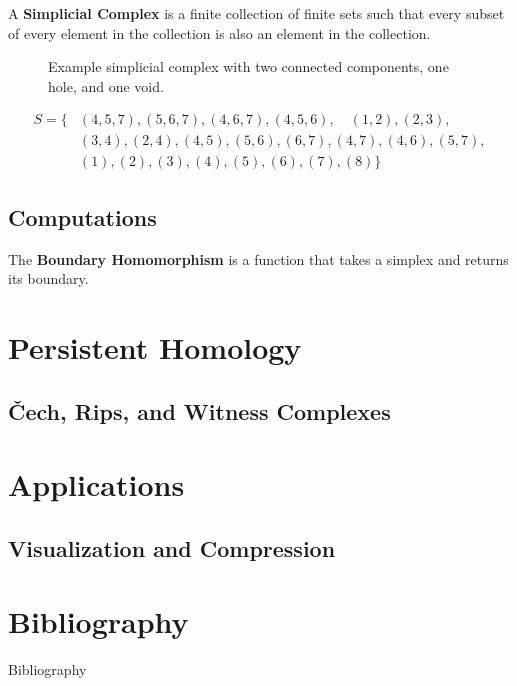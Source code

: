 \begin{frame}
	\begin{definition}
		A \textbf{Simplicial Complex} is a finite collection of finite sets such that every subset of every element in the collection is also an element in the collection. \cite{wagner}
	\end{definition}
	\begin{figure}
		
		\caption{Example simplicial complex with two connected components, one hole, and one void.}
	\end{figure}
	\begin{align*}
		S = \{
			&(4,5,7), (5,6,7), (4,6,7), (4,5,6),\quad (1,2), (2,3),\\ &(3,4), (2,4), (4,5), (5,6),(6,7),(4,7),(4,6),(5,7),\\
			&(1), (2), (3), (4), (5), (6), (7), (8)
		\}
	\end{align*}
\end{frame}

\subsection{Computations}
\begin{frame}
	\begin{definition}
		The \textbf{Boundary Homomorphism} is a function that takes a simplex and returns its boundary.
	\end{definition}
\end{frame}


\section[Persistence]{Persistent Homology}
\subsection{\v{C}ech, Rips, and Witness Complexes}
\begin{frame}
\end{frame}

\section{Applications}
\subsection{Visualization and Compression}
\begin{frame}
\end{frame}

\section*{Bibliography}
\begin{frame}{Bibliography}
	\nocite{wagner}
	\nocite{hatcher}
	\nocite{fraleigha}
	\nocite{singh}
	\begingroup
	\renewcommand{\section}[2]{}%
	
	\endgroup
\end{frame}





